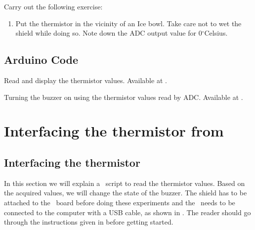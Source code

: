 \begin{exercise}
  Carry out the following exercise:
  \begin{enumerate}
    \item Put the thermistor in the vicinity of an Ice bowl. Take care not
          to wet the shield while doing so. Note down the ADC output value for
          0$^{\circ}$Celsius.
  \end{enumerate}
\end{exercise}

\subsection{Arduino Code}
\label{sec:therm-arduino-code}

\begin{ardcode}
   {Read and display
    the thermistor values.  Available at
    .}
  \label{ard:therm-read}
  
\end{ardcode}

\begin{ardcode}
  {Turning the buzzer on using the thermistor values read by
    ADC.  Available at
    .}
  \label{ard:therm-buzzer}
  
\end{ardcode}

\section{Interfacing the thermistor from \scilab}
\subsection{Interfacing the thermistor}
In this section we will explain a \scilab\ script to read the thermistor
values. Based on the acquired values, we will change
the state of the buzzer.  The shield has to be attached to the \arduino\ board
before doing these experiments and the \arduino\ needs to be connected to the computer
with a USB cable, as shown in .
The reader should go through the instructions given in
 before getting started.


